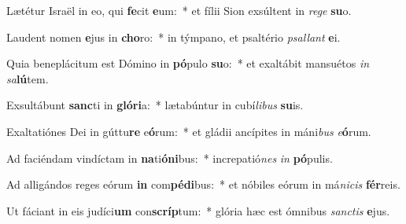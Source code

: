 \item Lætétur Israël in eo, qui \textbf{fe}cit \textbf{e}um:~* et fílii Sion exsúltent in \textit{re}\textit{ge} \textbf{su}o.
\item Laudent nomen \textbf{e}jus in \textbf{cho}ro:~* in týmpano, et psaltério \textit{psal}\textit{lant} \textbf{e}i.
\item Quia beneplácitum est Dómino in \textbf{pó}pulo \textbf{su}o:~* et exaltábit mansuétos \textit{in} \textit{sa}\textbf{lú}tem.
\item Exsultábunt \textbf{sanc}ti in \textbf{gló}\textbf{ri}a:~* lætabúntur in cubí\textit{li}\textit{bus} \textbf{su}is.
\item Exaltatiónes Dei in gúttu\textbf{re} e\textbf{ó}rum:~* et gládii ancípites in máni\textit{bus} \textit{e}\textbf{ó}rum.
\item Ad faciéndam vindíctam in \textbf{na}ti\textbf{ó}\textbf{ni}bus:~* increpatió\textit{nes} \textit{in} \textbf{pó}pulis.
\item Ad alligándos reges eórum \textbf{in} com\textbf{pé}\textbf{di}bus:~* et nóbiles eórum in má\textit{ni}\textit{cis} \textbf{fér}reis.
\item Ut fáciant in eis judíci\textbf{um} con\textbf{scríp}tum:~* glória hæc est ómnibus \textit{sanc}\textit{tis} \textbf{e}jus.
